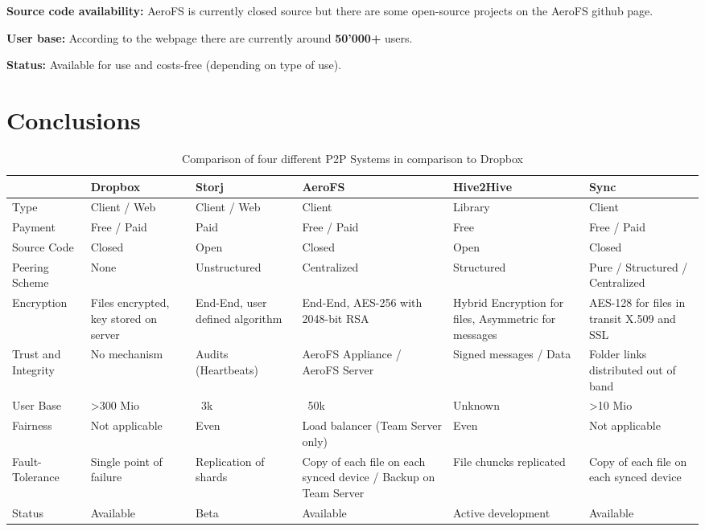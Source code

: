 \textbf{Source code availability:} AeroFS is currently closed source but there are some open-source projects on the AeroFS github page.

\textbf{User base:} According to the webpage \cite{aerofs} there are currently around \textbf{50'000\textsc{+}} users.

\textbf{Status:} Available for use and costs-free (depending on type of use).


\section{Conclusions}
\begin{table}
	\centering
	\caption{Comparison of four different P2P Systems in comparison to Dropbox}
		\begin{tabular}{ | *{6}{ p{2.5cm} |} }
			\hline
			& Dropbox & Storj & AeroFS & Hive2Hive & Sync \\ \hline
			Type & Client / Web & Client / Web & Client & Library & Client \\ \hline
			Payment & Free / Paid & Paid & Free / Paid & Free & Free / Paid \\ \hline
			Source Code & Closed & Open & Closed & Open & Closed \\ \hline
			Peering Scheme & None & Unstructured & Centralized & Structured & Pure / Structured / Centralized \\ \hline
			Encryption & Files encrypted, key stored on server & End-End, user defined algorithm & End-End, AES-256 with 2048-bit RSA & Hybrid Encryption for files, Asymmetric for messages & AES-128 for files in transit X.509 and SSL \\ \hline
			Trust and Integrity & No mechanism & Audits (Heartbeats) & AeroFS Appliance / AeroFS Server & Signed messages / Data & Folder links distributed out of band \\ \hline
			User Base & >300 Mio & ~3k & ~50k & Unknown & >10 Mio \\ \hline
			Fairness & Not applicable & Even & Load balancer (Team Server only) & Even & Not applicable \\ \hline
			Fault-Tolerance & Single point of failure & Replication of shards & Copy of each file on each synced device / Backup on Team Server & File chuncks replicated & Copy of each file on each synced device \\ \hline
			Status & Available & Beta & Available & Active development & Available \\ \hline
		\end{tabular}
\end{table}

